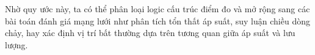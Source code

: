 Nhờ quy ước này, ta có thể phân loại logic cấu trúc điểm đo và mở rộng sang các bài toán đánh giá mạng lưới như phân tích tổn thất áp suất, suy luận chiều dòng chảy, hay xác định vị trí bất thường dựa trên tương quan giữa áp suất và lưu lượng.


